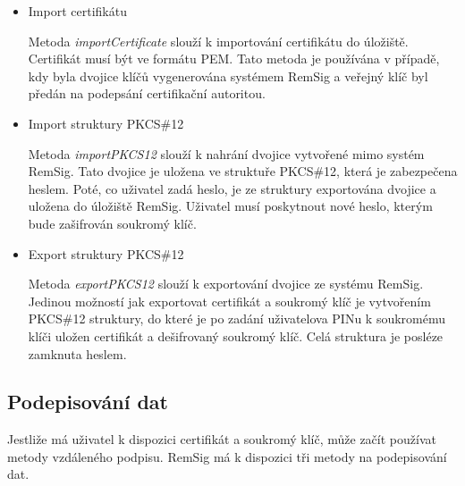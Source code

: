 \documentclass[]{fithesis3}
\begin{document}
	\begin{itemize}
	\item Import certifikátu 

		Metoda \textit{importCertificate} slouží k importování certifikátu do úložiště. Certifikát 			musí být ve formátu PEM. Tato metoda je používána v případě, kdy byla dvojice klíčů 				vygenerována systémem RemSig a veřejný klíč byl předán na podepsání certifikační 				autoritou.

	\item Import struktury PKCS\#12

		Metoda \textit{importPKCS12} slouží k nahrání dvojice vytvořené mimo systém RemSig. 			Tato dvojice je uložena ve struktuře PKCS\#12, která je zabezpečena heslem. Poté, co 			uživatel zadá heslo, je ze struktury exportována dvojice a uložena do úložiště RemSig. 				Uživatel musí poskytnout nové heslo, kterým bude zašifrován soukromý klíč.

	\item Export struktury PKCS\#12

		Metoda \textit{exportPKCS12} slouží k exportování dvojice ze systému RemSig. Jedinou 			možností jak exportovat certifikát a soukromý klíč je vytvořením PKCS\#12 struktury, do 		které je po zadání uživatelova PINu k soukromému klíči uložen certifikát a dešifrovaný 				soukromý klíč. Celá struktura je posléze zamknuta heslem.
	\end{itemize}

	\subsection{Podepisování dat}

	Jestliže má uživatel k dispozici certifikát a soukromý klíč, může začít používat metody 				vzdáleného podpisu. RemSig má k dispozici tři metody na podepisování dat.
\end{document}
